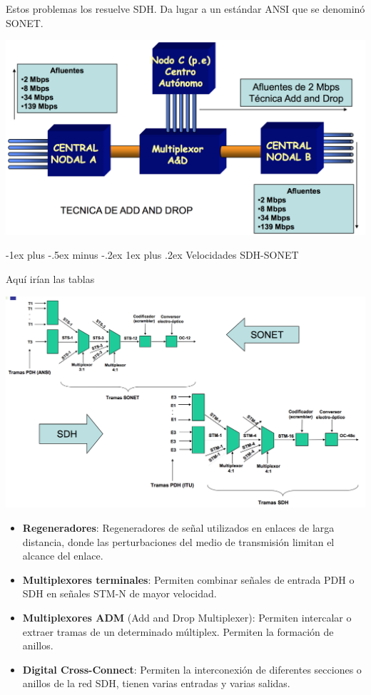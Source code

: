 \documentclass[10pt,portrait, twocolumn]{article}
\makeatletter
\renewcommand{\subsubsection}{\@startsection{subsubsection}{3}{0mm}%
                                {-1ex plus -.5ex minus -.2ex}%
                                {1ex plus .2ex}%
                                {\normalfont\small\bfseries}}
\makeatother
\begin{document}
Estos problemas los resuelve SDH. Da lugar a un estándar ANSI que se denominó SONET.

	\begin{center}
		\includegraphics[scale=0.2]{images/AddDrop}
	\end{center}


\subsubsection{Velocidades SDH-SONET}

Aquí irían las tablas

	\begin{center}
		\includegraphics[scale=0.2]{images/EjemploTrans}
	\end{center}

\begin{itemize}
	\item \textbf{Regeneradores}: Regeneradores de señal utilizados en enlaces de larga distancia, donde las perturbaciones del medio de transmisión limitan el alcance del enlace.
	\item \textbf{Multiplexores terminales}: Permiten combinar señales de entrada PDH o SDH en señales STM-N de mayor velocidad.
	\item \textbf{Multiplexores ADM} (Add and Drop Multiplexer): Permiten intercalar o extraer tramas de un determinado múltiplex. Permiten la formación de anillos.
	\item \textbf{Digital Cross-Connect}: Permiten la interconexión de diferentes secciones o anillos de la red SDH, tienen varias entradas y varias salidas.
\end{itemize}
\end{document}
